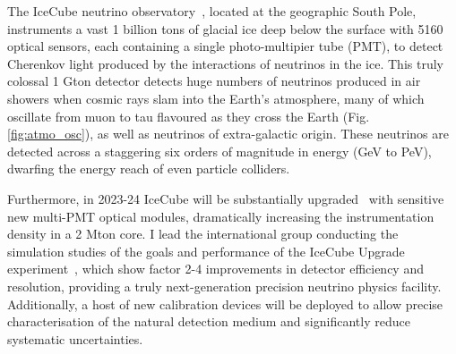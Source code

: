 \documentclass[a4paper,11pt]{article}
\begin{document}
The IceCube neutrino observatory~\cite{Aartsen_2017}, located at the geographic South Pole, instruments a vast 1 billion tons of glacial ice deep below the surface with 5160 optical sensors, each containing a single photo-multipier tube (PMT), to detect Cherenkov light produced by the interactions of neutrinos in the ice. This truly colossal 1 Gton detector detects huge numbers of neutrinos produced in air showers when cosmic rays slam into the Earth's atmosphere, many of which oscillate from muon to tau flavoured as they cross the Earth (Fig. \ref{fig:atmo_osc}), as well as neutrinos of extra-galactic origin. These neutrinos are detected across a staggering six orders of magnitude in energy (GeV to PeV), dwarfing the energy reach of even particle colliders. 




Furthermore, in 2023-24 IceCube will be substantially upgraded~\cite{IceCubeUpgrade_ICRC2019} with sensitive new multi-PMT optical modules, dramatically increasing the instrumentation density in a 2 Mton core. I lead the international group conducting the simulation studies of the goals and performance of the IceCube Upgrade experiment~\cite{IceCubeUpgrade_ICRC2019, NuFactProceedings}, which show factor 2-4 improvements in detector efficiency and resolution, providing a truly next-generation precision neutrino physics facility. Additionally, a host of new calibration devices will be deployed to allow precise characterisation of the natural detection medium and significantly reduce systematic uncertainties.\\



\end{document}
